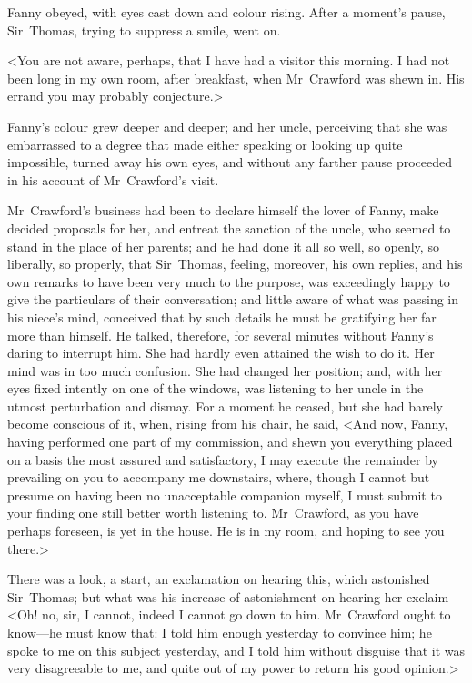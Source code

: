 Fanny obeyed, with eyes cast down and colour rising. After a moment's pause, Sir~Thomas, trying to suppress a smile, went on.

<You are not aware, perhaps, that I have had a visitor this morning. I had not been long in my own room, after breakfast, when Mr~Crawford was shewn in. His errand you may probably conjecture.>

Fanny's colour grew deeper and deeper; and her uncle, perceiving that she was embarrassed to a degree that made either speaking or looking up quite impossible, turned away his own eyes, and without any farther pause proceeded in his account of Mr~Crawford's visit.

Mr~Crawford's business had been to declare himself the lover of Fanny, make decided proposals for her, and entreat the sanction of the uncle, who seemed to stand in the place of her parents; and he had done it all so well, so openly, so liberally, so properly, that Sir~Thomas, feeling, moreover, his own replies, and his own remarks to have been very much to the purpose, was exceedingly happy to give the particulars of their conversation; and little aware of what was passing in his niece's mind, conceived that by such details he must be gratifying her far more than himself. He talked, therefore, for several minutes without Fanny's daring to interrupt him. She had hardly even attained the wish to do it. Her mind was in too much confusion. She had changed her position; and, with her eyes fixed intently on one of the windows, was listening to her uncle in the utmost perturbation and dismay. For a moment he ceased, but she had barely become conscious of it, when, rising from his chair, he said, <And now, Fanny, having performed one part of my commission, and shewn you everything placed on a basis the most assured and satisfactory, I may execute the remainder by prevailing on you to accompany me downstairs, where, though I cannot but presume on having been no unacceptable companion myself, I must submit to your finding one still better worth listening to. Mr~Crawford, as you have perhaps foreseen, is yet in the house. He is in my room, and hoping to see you there.>

There was a look, a start, an exclamation on hearing this, which astonished Sir~Thomas; but what was his increase of astonishment on hearing her exclaim—<Oh! no, sir, I cannot, indeed I cannot go down to him. Mr~Crawford ought to know—he must know that: I told him enough yesterday to convince him; he spoke to me on this subject yesterday, and I told him without disguise that it was very disagreeable to me, and quite out of my power to return his good opinion.>

